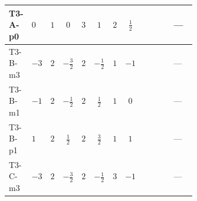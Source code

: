 \documentclass[8pt]{article}
\begin{document}
\begin{landscape}
\begin{longtable}{@{}llcccccc >{\raggedright\arraybackslash}p{0.21\linewidth} >{\raggedright\arraybackslash}p{0.21\linewidth} >{\raggedright\arraybackslash}p{0.21\linewidth}@{}}
\midrule
T3-A-p0 & $0$ & $1$ & $0$ & $3$ & $1$ & $2$ & $\frac{1}{2}$ & \scriptsize\adjustbox{max width=\linewidth}{$\begin{gathered} 8 {\lambda_{S_1}^{(1)}} T_{\nu}^{(1)}\end{gathered}$} & \scriptsize\adjustbox{max width=\linewidth}{$\begin{gathered} -8 \operatorname{Tr}\!\left({y_1}\,\left({y_1}\right)^{\dagger}\,{y_1}\,\left({y_1}\right)^{\dagger}\right)\end{gathered}$} & --- \\
\midrule
T3-B-m3 & $-3$ & $2$ & $-\frac{3}{2}$ & $2$ & $-\frac{1}{2}$ & $1$ & $-1$ & \scriptsize\adjustbox{max width=\linewidth}{$\begin{gathered} 4 {\lambda_{S_1}^{(1)}} T_{\nu}^{(1)}\end{gathered}$} & \scriptsize\adjustbox{max width=\linewidth}{$\begin{gathered} -4 \operatorname{Tr}\!\left({y_1}\,\left({y_1}\right)^{\dagger}\,{y_1}\,\left({y_1}\right)^{\dagger}\right)\end{gathered}$} & --- \\
\midrule
T3-B-m1 & $-1$ & $2$ & $-\frac{1}{2}$ & $2$ & $\frac{1}{2}$ & $1$ & $0$ & \scriptsize\adjustbox{max width=\linewidth}{$\begin{gathered} 4 {\lambda_{S_1}^{(1)}} T_{\nu}^{(1)}\end{gathered}$} & \scriptsize\adjustbox{max width=\linewidth}{$\begin{gathered} -4 \operatorname{Tr}\!\left({y_1}\,\left({y_1}\right)^{\dagger}\,{y_1}\,\left({y_1}\right)^{\dagger}\right)\end{gathered}$} & --- \\
\midrule
T3-B-p1 & $1$ & $2$ & $\frac{1}{2}$ & $2$ & $\frac{3}{2}$ & $1$ & $1$ & \scriptsize\adjustbox{max width=\linewidth}{$\begin{gathered} 4 {\lambda_{S_1}^{(1)}} T_{\nu}^{(1)}\end{gathered}$} & \scriptsize\adjustbox{max width=\linewidth}{$\begin{gathered} -4 \operatorname{Tr}\!\left({y_1}\,\left({y_1}\right)^{\dagger}\,{y_1}\,\left({y_1}\right)^{\dagger}\right)\end{gathered}$} & --- \\
\midrule
T3-C-m3 & $-3$ & $2$ & $-\frac{3}{2}$ & $2$ & $-\frac{1}{2}$ & $3$ & $-1$ & \scriptsize\adjustbox{max width=\linewidth}{$\begin{gathered} 6 {\lambda_{S_1}^{(1)}} T_{\nu}^{(1)}\end{gathered}$} & \scriptsize\adjustbox{max width=\linewidth}{$\begin{gathered} -5 \operatorname{Tr}\!\left({y_1}\,\left({y_1}\right)^{\dagger}\,{y_1}\,\left({y_1}\right)^{\dagger}\right)\end{gathered}$} & --- \\

\end{longtable}
\end{landscape}
\end{document}

